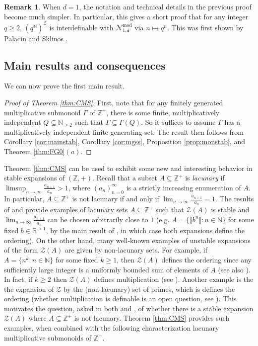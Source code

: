\documentclass{amsart}
\def\seq{\subseteq}
\newcommand{\ms}{\mathfrak{s}}
\def\mod{\operatorname{mod}}
\newcommand{\cN}{\mathcal{N}}
\newcommand{\cZ}{\mathcal{Z}}
\def\N{\mathbb N}
\def\R{\mathbb R}
\def\Z{\mathbb Z}
\theoremstyle{definition}
\newtheorem{remark}[theorem]{Remark}
\begin{document}
\begin{remark}
When $d=1$, the notation and technical details in the previous proof become much simpler. In particular, this gives a short proof that for any integer $q\geq 2$, $(q^{\N})^{\cZ}$ is interdefinable with $\cN^{\mod}_{1,\ms}$ via $n\mapsto q^n$. This was first shown by Palac\'{i}n and Sklinos \cite{PaSk}. 
\end{remark}

\subsection{Main results and consequences}\label{sec:mggcors}

We can now prove the first main result.

\begin{proof}[Proof of Theorem \ref{thm:CMS}]
First, note that for any finitely generated multiplicative submonoid $\Gamma$ of $\Z^+$, there is some finite, multiplicatively independent $Q\seq\N_{\geq 2}$ such that $\Gamma\seq\Gamma(Q)$. So it suffices to assume $\Gamma$ has a multiplicatively independent finite generating set. The result then follows from Corollary \ref{cor:mainstab}, Corollary \ref{cor:mgss}, Proposition \ref{prop:monstab}, and Theorem \ref{thm:FG0}$(a)$. 
\end{proof}

Theorem \ref{thm:CMS} can be used to exhibit some new and interesting behavior in stable expansions of $(\Z,+)$. Recall that a subset $A\seq\Z^+$ is \emph{lacunary} if $\limsup_{n\to\infty}\frac{a_{n+1}}{a_n}>1$, where $(a_n)_{n=0}^\infty$ is a strictly increasing enumeration of $A$. In particular, $A\seq\Z^+$ is not lacunary if and only if $\lim_{n\to\infty}\frac{a_{n+1}}{a_n}=1$. The results of \cite{CoSS} and \cite{PoLa} provide examples of lacunary sets $A\seq\Z^+$ such that $\cZ(A)$ is stable and $\lim_{n\to\infty}\frac{a_{n+1}}{a_n}$ can be chosen arbitrarily close to $1$ (e.g. $A=\{\llbracket b^n\rrbracket :n\in\N\}$ for some fixed $b\in\R^{>1}$, by the main result of \cite{CoSS}, in which case both expansions define the ordering).  On the other hand, many well-known examples of unstable expansions of the form $\cZ(A)$ are given by non-lacunary sets. For example, if $A=\{n^k:n\in\N\}$ for some fixed $k\geq 1$, then $\cZ(A)$ defines the ordering since any sufficiently large integer is a uniformly bounded sum of elements of $A$ (see also \cite[Section 8.1]{CoSS}). In fact, if $k\geq 2$ then $\cZ(A)$ defines multiplication (see \cite[Proposition 6]{Bes}). Another example is the the expansion of $\cZ$ by the (non-lacunary) set  of primes, which is  defines the ordering  (whether multiplication is definable is an open question, see \cite{Bes}).  This motivates the question, asked in both \cite{CoSS} and \cite{PoLa}, of whether there is a stable expansion $\cZ(A)$ where $A\seq \Z^+$ is not lacunary. Theorem \ref{thm:CMS} provides such examples, when combined with the following characterization lacunary multiplicative submonoids of $\Z^+$.
\end{document}
